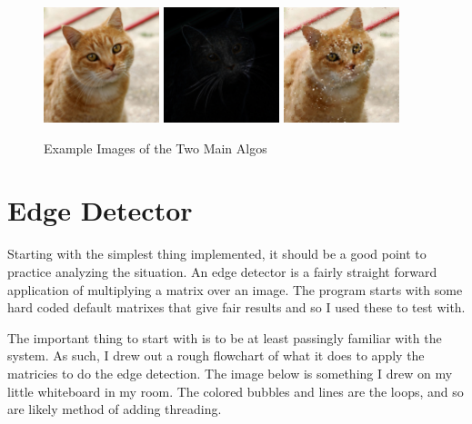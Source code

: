 \documentclass[12pt]{article}
\begin{document}
\begin{figure}[htb]
	\centering
	\includegraphics[width=0.3\textwidth]{example_source.jpg}
	\includegraphics[width=0.3\textwidth]{example_edge.png}
	\includegraphics[width=0.3\textwidth]{example_circles.png}
	\caption{Example Images of the Two Main Algos}
\end{figure}

\newpage
\section{Edge Detector}

Starting with the simplest thing implemented, it should be a good point to practice analyzing the situation.
An edge detector is a fairly straight forward application of multiplying a matrix over an image.
The program starts with some hard coded default matrixes that give fair results and so I used these to test with.

The important thing to start with is to be at least passingly familiar with the system.
As such, I drew out a rough flowchart of what it does to apply the matricies to do the edge detection.
The image below is something I drew on my little whiteboard in my room.
The colored bubbles and lines are the loops, and so are likely method of adding threading.
\end{document}
